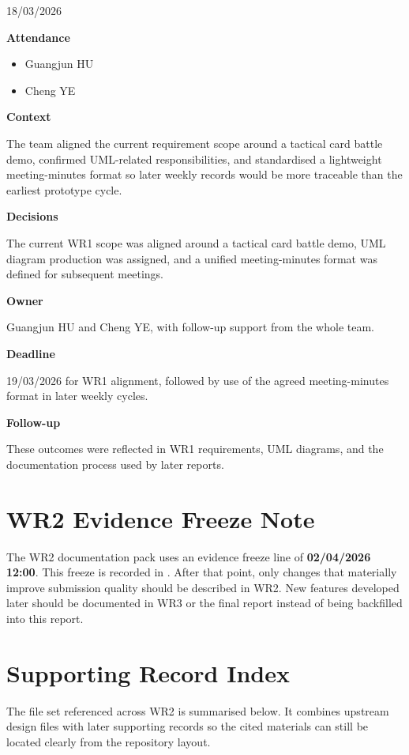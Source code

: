 18/03/2026

\textbf{Attendance}

\begin{itemize}
\item Guangjun HU
\item Cheng YE
\end{itemize}

\textbf{Context}

The team aligned the current requirement scope around a tactical card battle demo, confirmed UML-related responsibilities, and standardised a lightweight meeting-minutes format so later weekly records would be more traceable than the earliest prototype cycle.

\textbf{Decisions}

The current WR1 scope was aligned around a tactical card battle demo, UML diagram production was assigned, and a unified meeting-minutes format was defined for subsequent meetings.

\textbf{Owner}

Guangjun HU and Cheng YE, with follow-up support from the whole team.

\textbf{Deadline}

19/03/2026 for WR1 alignment, followed by use of the agreed meeting-minutes format in later weekly cycles.

\textbf{Follow-up}

These outcomes were reflected in WR1 requirements, UML diagrams, and the documentation process used by later reports.

\section{WR2 Evidence Freeze Note}

The WR2 documentation pack uses an evidence freeze line of \textbf{02/04/2026 12:00}. This freeze is recorded in . After that point, only changes that materially improve submission quality should be described in WR2. New features developed later should be documented in WR3 or the final report instead of being backfilled into this report.

\section{Supporting Record Index}
\label{sec:supporting-index}

The file set referenced across WR2 is summarised below. It combines upstream design files with later supporting records so the cited materials can still be located clearly from the repository layout.

